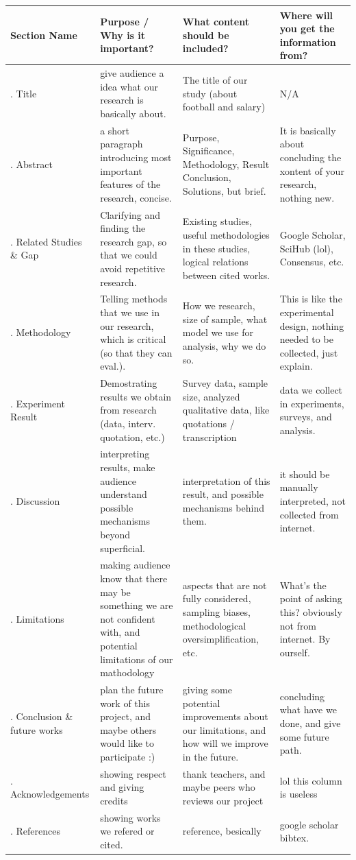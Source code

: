\documentclass{article}
\begin{document}
\renewcommand{\arraystretch}{1.5} %
\setlength{\tabcolsep}{8pt}
\noindent
\begin{tabularx}{\textwidth}{ >{\raggedright\arraybackslash}X >{\raggedright\arraybackslash}X >{\raggedright\arraybackslash}X >{\raggedright\arraybackslash}X }
\hline
\textbf{Section Name} & \textbf{Purpose / Why is it important?} & \textbf{What content should be included?} & \textbf{Where will you get the information from?} \\ \hline
1. Title& give audience a idea what our research is basically about.& The title of our study (about football and salary) & N/A \\ \hline
2. Abstract& a short paragraph introducing most important features of the research, concise. & Purpose, Significance, Methodology, Result Conclusion, Solutions, but brief. & It is basically about concluding the xontent of your research, nothing new.\\ \hline
3. Related Studies \& Gap& Clarifying and finding the research gap, so that we could avoid repetitive research.& Existing studies, useful methodologies in these studies, logical relations between cited works. & Google Scholar, SciHub (lol), Consensus, etc.\\ \hline
4. Methodology& Telling methods that we use in our research, which is critical (so that they can eval.). & How we research, size of sample, what model we use for analysis, why we do so. & This is like the experimental design, nothing needed to be collected, just explain.\\ \hline
5. Experiment Result& Demostrating results we obtain from research (data, interv. quotation, etc.) & Survey data, sample size, analyzed qualitative data, like quotations / transcription & data we collect in experiments, surveys, and analysis. \\ \hline
6. Discussion & interpreting results, make audience understand possible mechanisms beyond superficial. & interpretation of this result, and possible mechanisms behind them. & it should be manually interpreted, not collected from internet. \\ \hline
7. Limitations & making audience know that there may be something we are not confident with, and potential limitations of our mathodology & aspects that are not fully considered, sampling biases, methodological oversimplification, etc. & What's the point of asking this? obviously not from internet. By ourself. \\ \hline
8. Conclusion \& future works& plan the future work of this project, and maybe others would like to participate :) & giving some potential improvements about our limitations, and how will we improve in the future. & concluding what have we done, and give some future path.\\ \hline
9. Acknowledgements& showing respect and giving credits & thank teachers, and maybe peers who reviews our project & lol this column is useless \\ \hline
10. References& showing works we refered or cited. & reference, besically & google scholar bibtex. \\ \hline
\end{tabularx}
\end{document}
